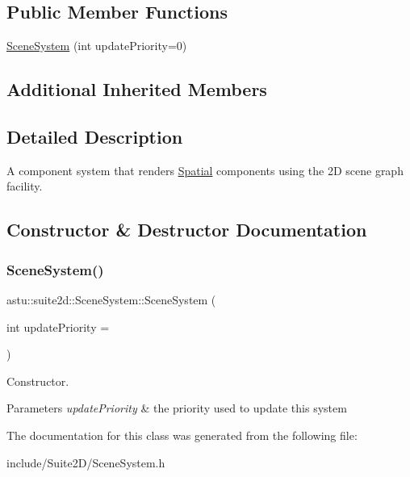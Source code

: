 \subsection*{Public Member Functions}
\begin{DoxyCompactItemize}
\item 
\hyperlink{classastu_1_1suite2d_1_1SceneSystem_ad7c6c40b878d7b07556cda4f074c6aa0}{Scene\+System} (int update\+Priority=0)
\end{DoxyCompactItemize}
\subsection*{Additional Inherited Members}


\subsection{Detailed Description}
A component system that renders \hyperlink{classastu_1_1suite2d_1_1Spatial}{Spatial} components using the 2D scene graph facility. 

\subsection{Constructor \& Destructor Documentation}
\mbox{\label{classastu_1_1suite2d_1_1SceneSystem_ad7c6c40b878d7b07556cda4f074c6aa0}} 
\subsubsection{\texorpdfstring{Scene\+System()}{SceneSystem()}}
{\footnotesize\ttfamily astu\+::suite2d\+::\+Scene\+System\+::\+Scene\+System (\begin{DoxyParamCaption}\item[{int}]{update\+Priority = {} }\end{DoxyParamCaption})}

Constructor.


\begin{DoxyParams}{Parameters}
{\em update\+Priority} & the priority used to update this system \\
\hline
\end{DoxyParams}


The documentation for this class was generated from the following file\+:\begin{DoxyCompactItemize}
\item 
include/\+Suite2\+D/Scene\+System.\+h\end{DoxyCompactItemize}
